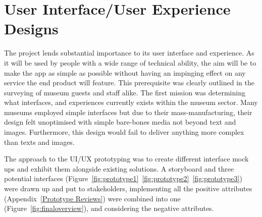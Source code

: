 {\section{User Interface/User Experience Designs}
The project lends substantial importance to its user interface and experience. As it will be used by people with a wide range of technical ability, the aim will be to make the app as simple as possible without having an impinging effect on any service the end product will feature. This prerequisite was clearly outlined in the surveying of museum guests and staff alike. The first mission was determining what interfaces, and experiences currently exists within the museum sector. Many museums employed simple interfaces but due to their mass-manufacturing, their design felt unoptimised with simple bare-bones media not beyond text and images. Furthermore, this design would fail to deliver anything more complex than texts and images.
  
The approach to the UI/UX prototyping was to create different interface mock ups and exhibit them alongside existing solutions. A storyboard and three potential interfaces (Figure~\ref{fig:prototype1}~\ref{fig:prototype2}~\ref{fig:prototype3}) were drawn up and put to stakeholders, implementing all the positive attributes (Appendix~\ref{Prototype Reviews}) were combined into one (Figure~\ref{fig:finaloverview}), and considering the negative attributes.

}
